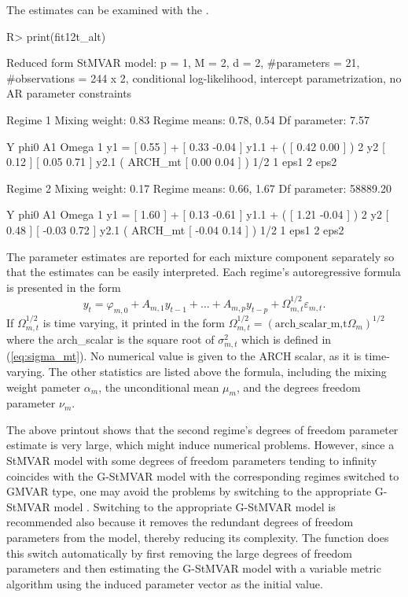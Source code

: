 \documentclass[nojss]{jss} %
\begin{document}
The estimates can be examined with the .
%
\begin{Schunk}
\begin{Sinput}
R> print(fit12t_alt)
\end{Sinput}
\begin{Soutput}
Reduced form StMVAR model:
 p = 1, M = 2, d = 2, #parameters = 21, #observations = 244 x 2,
 conditional log-likelihood, intercept parametrization, no AR parameter constraints 

Regime 1
Mixing weight: 0.83 
Regime means: 0.78, 0.54
Df parameter:  7.57

   Y     phi0          A1                            Omega         
1 y1 = [ 0.55 ] + [  0.33 -0.04 ] y1.1 + (         [  0.42 0.00 ] )
2 y2   [ 0.12 ]   [  0.05  0.71 ] y2.1   ( ARCH_mt [  0.00 0.04 ] )
  1/2     
1     eps1
2     eps2

Regime 2
Mixing weight: 0.17 
Regime means: 0.66, 1.67
Df parameter:  58889.20

   Y     phi0          A1                            Omega          
1 y1 = [ 1.60 ] + [  0.13 -0.61 ] y1.1 + (         [  1.21 -0.04 ] )
2 y2   [ 0.48 ]   [ -0.03  0.72 ] y2.1   ( ARCH_mt [ -0.04  0.14 ] )
  1/2     
1     eps1
2     eps2
\end{Soutput}
\end{Schunk}
%
The parameter estimates are reported for each mixture component separately so that the estimates can be easily interpreted. Each regime's autoregressive formula is presented in the form
\begin{equation}
y_t = \varphi_{m,0} + A_{m,1}y_{t - 1} + ... + A_{m,p}y_{t - p} + \Omega_{m,t}^{1/2}\varepsilon_{m,t}.
\end{equation}
If $\Omega_{m,t}^{1/2}$ is time varying, it printed in the form $\Omega_{m,t}^{1/2}=(\text{arch\_scalar_{m,t}}\Omega_m)^{1/2}$ where the arch\_scalar is the square root of $\sigma_{m,t}^2$ which is defined in (\ref{eq:sigma_mt}). No numerical value is given to the ARCH scalar, as it is time-varying. The other statistics are listed above the formula, including the mixing weight pameter $\alpha_m$, the unconditional mean $\mu_m$, and the degrees freedom parameter $\nu_m$.

The above printout shows that the second regime's degrees of freedom parameter estimate is very large, which might induce numerical problems. However, since a StMVAR model with some degrees of freedom parameters tending to infinity coincides with the G-StMVAR model with the corresponding regimes switched to GMVAR type, one may avoid the problems by switching to the appropriate G-StMVAR model \citep[see][]{Virolainen2:2021}. Switching to the appropriate G-StMVAR model is recommended also because it removes the redundant degrees of freedom parameters from the model, thereby reducing its complexity. The function  does this switch automatically by first removing the large degrees of freedom parameters and then estimating the G-StMVAR model with a variable metric algorithm \citep[algorithm 21]{Nash:1990} using the induced parameter vector as the initial value.
\end{document}
